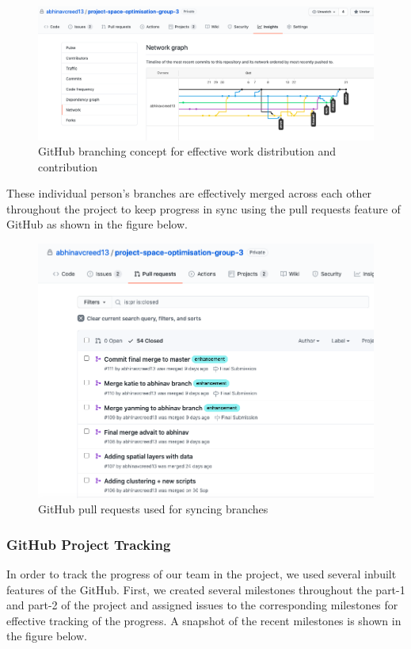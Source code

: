 \begin{figure}[H]
\centering
\includegraphics[width=16cm]{resources/images/github/github2.png}
\caption{GitHub branching concept for effective work distribution and contribution}
\label{fig:github2}
\end{figure}

These individual person's branches are effectively merged across each other throughout the project to keep progress in sync using the pull requests feature of GitHub as shown in the figure below.

\begin{figure}[H]
\centering
\includegraphics[width=12cm]{resources/images/github/github3.png}
\caption{GitHub pull requests used for syncing branches}
\label{fig:github3}
\end{figure}

\subsubsection{GitHub Project Tracking}

In order to track the progress of our team in the project, we used several inbuilt features of the GitHub. First, we created several milestones throughout the part-1 and part-2 of the project and assigned issues to the corresponding milestones for effective tracking of the progress. A snapshot of the recent milestones is shown in the figure below.

